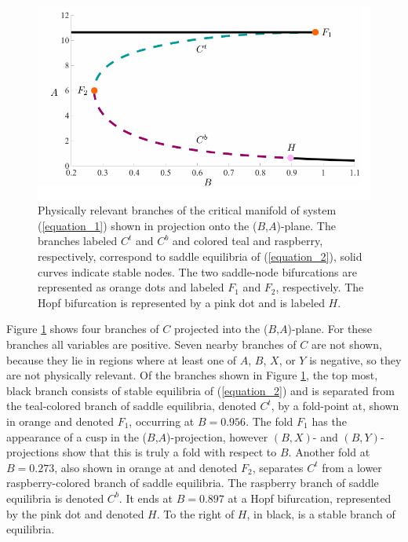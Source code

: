 \documentclass{ws-ijbc}
\begin{document}
\begin{figure}[!t]
\begin{center}
\includegraphics[page=1, width=\textwidth]{figures.pdf}
\end{center}
\caption{Physically relevant branches of the critical manifold of system (\ref{equation_1}) shown in projection onto the ($B$,$A$)-plane.  The branches labeled $C^t$ and $C^b$ and colored teal and raspberry, respectively, correspond to saddle equilibria of (\ref{equation_2}), solid curves indicate stable nodes.  The two saddle-node bifurcations are represented as orange dots and labeled $F_1$ and $F_2$, respectively.  The Hopf bifurcation is represented by a pink dot and is labeled $H$.}
\label{critical_figure}
\end{figure}

Figure \ref{critical_figure} shows four branches of $C$ projected into the ($B$,$A$)-plane.  For these branches all variables are positive.  Seven nearby branches of $C$ are not shown, because they lie in regions where at least one of $A$, $B$, $X$, or $Y$ is negative, so they are not physically relevant.  Of the branches shown in Figure \ref{critical_figure}, the top most, black branch consists of stable equilibria of (\ref{equation_2}) and is separated from the teal-colored branch of saddle equilibria, denoted $C^t$, by a fold-point at, shown in orange and denoted $F_1$, occurring at $B = 0.956$.  The fold $F_1$ has the appearance of a cusp in the ($B$,$A$)-projection, however $(B,X)$- and $(B,Y)$- projections show that this is truly a fold with respect to $B$.  Another fold at $B = 0.273$, also shown in orange at and denoted $F_2$, separates $C^t$ from a lower raspberry-colored branch of saddle equilibria.  The raspberry branch of saddle equilibria is denoted $C^b$.  It ends at $B = 0.897$ at a Hopf bifurcation, represented by the pink dot and denoted $H$.  To the right of $H$, in black, is a stable branch of equilibria.  
    
\end{document}
